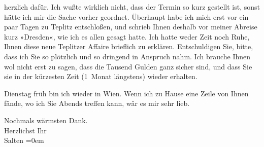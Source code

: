                herzlich dafür. Ich wußte wirklich nicht, dass der Termin so kurz gestellt ist, sonst
               hätte ich mir die Sache vorher geordnet. Überhaupt habe ich mich erst vor ein paar
               Tagen zu Teplitz entschloßen, und schrieb Ihnen
               deshalb vor meiner Abreise kurz »Dresden«, wie
               ich es allen gesagt hatte. Ich hatte {\pb}weder Zeit noch Ruhe, Ihnen
               diese neue Teplitzer Affaire brieflich zu
               erklären. Entschuldigen Sie, bitte, dass ich Sie so plötzlich und so dringend in
               Anspruch nahm. Ich brauche Ihnen wol nicht erst zu sagen, dass die Tausend Gulden
               ganz sicher sind, und dass Sie sie in der kürzesten Zeit (1 Monat längstens) wieder
               erhalten.\pend
           
\pstart
           Dienstag früh bin ich wieder in Wien. Wenn ich zu Hause eine Zeile von Ihnen fände, wo ich Sie
                  Abends{ }{\pb}treffen kann, wär es mir sehr
               lieb.\pend
           
\pstart
           Nochmals wärmsten Dank. {\\[\baselineskip]}Herzlichst Ihr {\\[\baselineskip]}\spacefill\mbox{Salten}\pend
           \leftskip=0em{}\endnumbering{}  \newcommand{\dateiname}{L03291}\newcommand{\titel}{Felix Salten an Arthur Schnitzler, 6. 5. 1899}\newcommand{\editorInnen}{Martin Anton Müller und Laura Untner}
